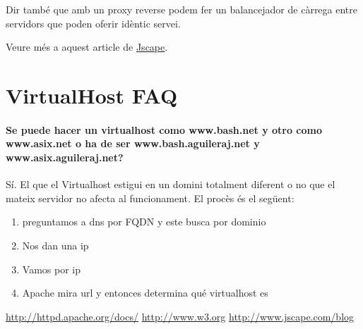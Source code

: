 \documentclass[a4paper, 11pt]{article}
\begin{document}
Dir tamb\'e que amb un proxy reverse podem fer un balancejador de càrrega entre servidors que poden oferir idèntic servei.

Veure m\'es a aquest article de \href{http://www.jscape.com/blog/bid/87783/Forward-Proxy-vs-Reverse-Proxy}{Jscape}\cite{Jscape}.

\section{VirtualHost FAQ}
\paragraph{Se puede hacer un virtualhost como www.bash.net y otro como www.asix.net o ha de ser www.bash.aguileraj.net y www.asix.aguileraj.net?}
Sí. El que el Virtualhost estigui en un domini totalment diferent o no que el mateix servidor no afecta al funcionament. El procès \'es el següent:
\begin{enumerate}
	\item preguntamos a dns por FQDN y este busca por dominio
	\item Nos dan una ip
  \item Vamos por ip
	\item Apache mira url y entonces determina qu\'e  virtualhost es
\end{enumerate}

\begin{thebibliography}{99}
	 \url{http://httpd.apache.org/docs/}
	 \url{http://www.w3.org}
	 \url{http://www.jscape.com/blog}
\end{thebibliography}
\end{document}
